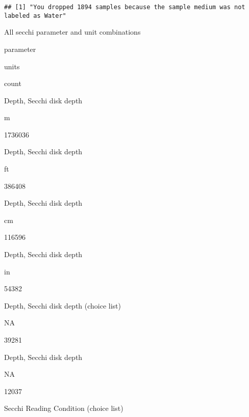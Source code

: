 \documentclass[]{article}
\newenvironment{Shaded}{\begin{snugshade}}{\end{snugshade}}
\newcommand{\CommentTok}[1]{\textcolor[rgb]{0.56,0.35,0.01}{\textit{#1}}}
\newcommand{\DataTypeTok}[1]{\textcolor[rgb]{0.13,0.29,0.53}{#1}}
\newcommand{\KeywordTok}[1]{\textcolor[rgb]{0.13,0.29,0.53}{\textbf{#1}}}
\newcommand{\NormalTok}[1]{#1}
\newcommand{\OperatorTok}[1]{\textcolor[rgb]{0.81,0.36,0.00}{\textbf{#1}}}
\newcommand{\StringTok}[1]{\textcolor[rgb]{0.31,0.60,0.02}{#1}}
\begin{document}
\begin{verbatim}
## [1] "You dropped 1894 samples because the sample medium was not labeled as Water"
\end{verbatim}

\begin{Shaded}
\end{Shaded}

All secchi parameter and unit combinations

parameter

units

count

Depth, Secchi disk depth

m

1736036

Depth, Secchi disk depth

ft

386408

Depth, Secchi disk depth

cm

116596

Depth, Secchi disk depth

in

54382

Depth, Secchi disk depth (choice list)

NA

39281

Depth, Secchi disk depth

NA

12037

Secchi Reading Condition (choice list)
\end{document}
